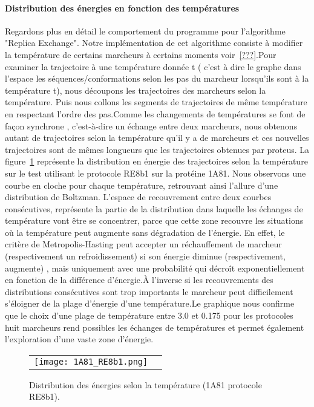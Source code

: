 \paragraph{Distribution des énergies en fonction des températures}

Regardons plus en détail le comportement du programme pour l'algorithme "Replica Exchange". Notre implémentation de cet algorithme consiste à modifier la température de certains marcheurs à certains moments voir~\ref{???}.Pour examiner la trajectoire à une température donnée t ( c'est à dire le graphe dans l'espace les séquences/conformations selon les pas du marcheur lorsqu'ils sont à la température t), nous découpons les trajectoires des marcheurs  selon la température. Puis nous collons les segments de trajectoires de même température en respectant l'ordre des pas.Comme les changements de températures se font de façon synchrone , c’est-à-dire un échange entre deux marcheurs, nous obtenons autant de trajectoires selon la température qu'il y a de marcheurs et ces nouvelles trajectoires sont de mêmes longueurs que les trajectoires obtenues par proteus. La figure~\ref{graph:Distrib_E_T} représente la distribution en énergie des trajectoires selon la température sur le test utilisant le protocole RE8b1 sur la protéine 1A81. Nous observons une courbe en cloche pour chaque température, retrouvant ainsi l'allure d'une distribution de Boltzman.  L'espace de recouvrement entre deux courbes consécutives, représente la partie de la distribution dans laquelle les échanges de température vont être se concentrer, parce que cette zone recouvre les situations où la température peut augmente sans dégradation de l'énergie. En effet, le critère de Metropolis-Hasting peut accepter un réchauffement de marcheur (respectivement un refroidissement) si son énergie diminue  (respectivement, augmente) , mais uniquement avec une probabilité qui décroît exponentiellement en fonction de la différence d'énergie.À l'inverse si les recouvrements des distributions consécutives sont trop importants le marcheur peut difficilement s'éloigner de la plage d'énergie d'une température.Le graphique nous confirme que le choix d'une plage de température entre 3.0 et 0.175 pour les protocoles huit marcheurs rend possibles les échanges de températures et permet également l'exploration d'une vaste zone d'énergie.   




   \begin{figure}[t]
     \centering
     \begin{tabular}{cc}
       \texttt{[image: 1A81\_RE8b1.png]} &
     \end{tabular}
     
     \caption{Distribution des énergies selon la température (1A81 protocole RE8b1).}
\label{graph:Distrib_E_T}
   \end{figure}

